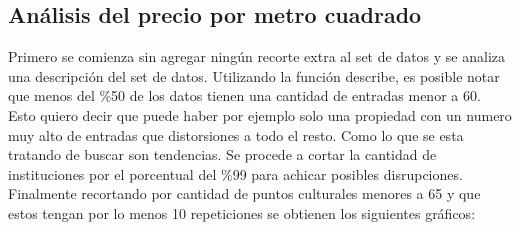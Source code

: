 \documentclass[a4paper, 10pt]{article}
\begin{document}
			\subsection{Análisis del precio por metro cuadrado}
				Primero se comienza sin agregar ningún recorte extra al set de datos y se 
				analiza una descripción del set de datos. Utilizando la función describe, 
				es posible notar que menos del \%50 de los datos tienen una cantidad de 
				entradas menor a 60. Esto quiero decir que puede haber por ejemplo solo 
				una propiedad con un numero muy alto de entradas que distorsiones a todo 
				el resto. Como lo que se esta tratando de buscar son tendencias. 
				Se procede a cortar la cantidad de instituciones por el porcentual del \%99 
				para achicar posibles disrupciones. 
				Finalmente recortando por cantidad de puntos culturales menores a 65 y 
				que estos tengan por lo menos 10 repeticiones se obtienen los siguientes gráficos:
\end{document}
